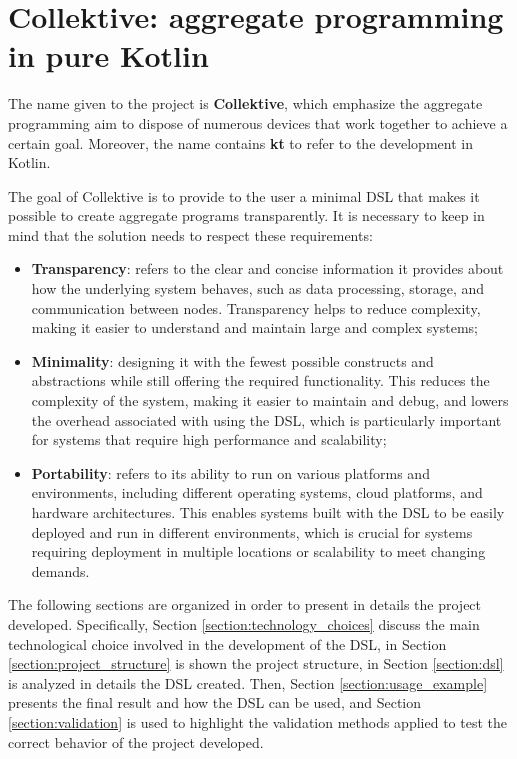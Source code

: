\chapter{Collektive: aggregate programming in pure Kotlin}\label{chapter:collektive}
The name given to the project is \textbf{Collektive}, which emphasize the aggregate programming aim to dispose of numerous devices that work together to achieve a certain goal. Moreover, the name contains \textbf{kt} to refer to the development in Kotlin.

The goal of Collektive is to provide to the user a minimal DSL that makes it possible to create aggregate programs transparently. It is necessary to keep in mind that the solution needs to respect these requirements:
\begin{itemize}
    \item \textbf{Transparency}: refers to the clear and concise information it provides about how the underlying system behaves, such as data processing, storage, and communication between nodes. Transparency helps to reduce complexity, making it easier to understand and maintain large and complex systems;
    \item \textbf{Minimality}: designing it with the fewest possible constructs and abstractions while still offering the required functionality. This reduces the complexity of the system, making it easier to maintain and debug, and lowers the overhead associated with using the DSL, which is particularly important for systems that require high performance and scalability;
    \item \textbf{Portability}: refers to its ability to run on various platforms and environments, including different operating systems, cloud platforms, and hardware architectures. This enables systems built with the DSL to be easily deployed and run in different environments, which is crucial for systems requiring deployment in multiple locations or scalability to meet changing demands.
\end{itemize}

The following sections are organized in order to present in details the project developed. Specifically, Section \ref{section:technology_choices} discuss the main technological choice involved in the development of the DSL, in Section \ref{section:project_structure} is shown the project structure, in Section \ref{section:dsl} is analyzed in details the DSL created. Then, Section \ref{section:usage_example} presents the final result and how the DSL can be used, and Section \ref{section:validation} is used to highlight the validation methods applied to test the correct behavior of the project developed.

